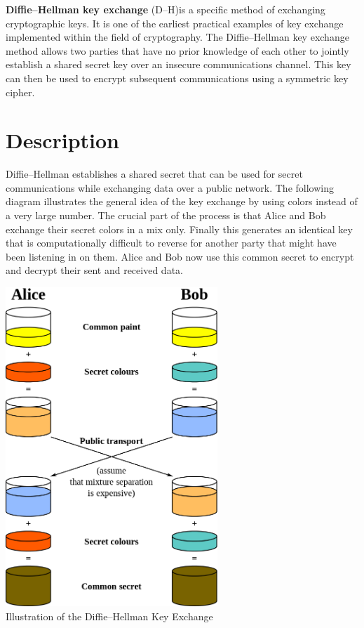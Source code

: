 \documentclass{article}
\begin{document}
  \textbf{Diffie–Hellman key exchange} (D–H)is a specific method of exchanging cryptographic keys. It is one of the earliest practical examples of key exchange implemented within the field of cryptography.
   The Diffie–Hellman key exchange method allows two parties that have no prior knowledge of each other to jointly establish a shared secret key over an insecure communications channel. 
   This key can then be used to encrypt subsequent communications using a symmetric key cipher.


  \section{Description}


  \begin{minipage}[b]{0.5\linewidth}
    Diffie–Hellman establishes a shared secret that can be used for secret communications while exchanging data over a public network. 
    The following diagram illustrates the general idea of the key exchange by using colors instead of a very large number.
    The crucial part of the process is that Alice and Bob exchange their secret colors in a mix only. Finally this generates an identical key that is computationally difficult 
    to reverse for another party that might have been listening in on them. Alice and Bob now use this common secret to encrypt and decrypt their sent and received data.
    \vspace{4cm}
  \end{minipage}
  \begin{minipage}[b]{0.5\linewidth}
    \begin{center}
      \includegraphics[width=0.6\textwidth]{dh}
      \\ Illustration of the Diffie–Hellman Key Exchange
    \end{center}
  \end{minipage}
\end{document}
